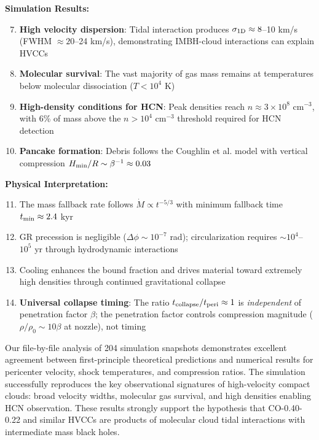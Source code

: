 \documentclass[twocolumn,amsmath,amssymb,prd,superscriptaddress,nofootinbib]{revtex4-2}
\begin{document}
\textbf{Simulation Results:}
\begin{enumerate}
    \setcounter{enumi}{6}
    \item \textbf{High velocity dispersion}: Tidal interaction produces $\sigma_{\rm 1D} \approx 8$--10 km/s (FWHM $\approx 20$--24 km/s), demonstrating IMBH-cloud interactions can explain HVCCs

    \item \textbf{Molecular survival}: The vast majority of gas mass remains at temperatures below molecular dissociation ($T < 10^4$ K)

    \item \textbf{High-density conditions for HCN}: Peak densities reach $n \approx 3 \times 10^8$ cm$^{-3}$, with 6\% of mass above the $n > 10^4$ cm$^{-3}$ threshold required for HCN detection

    \item \textbf{Pancake formation}: Debris follows the Coughlin et al. model with vertical compression $H_{\rm min}/R \sim \beta^{-1} \approx 0.03$
\end{enumerate}

\textbf{Physical Interpretation:}
\begin{enumerate}
    \setcounter{enumi}{10}
    \item The mass fallback rate follows $\dot{M} \propto t^{-5/3}$ with minimum fallback time $t_{\rm min} \approx 2.4$ kyr

    \item GR precession is negligible ($\Delta\phi \sim 10^{-7}$ rad); circularization requires $\sim 10^4$--$10^5$ yr through hydrodynamic interactions

    \item Cooling enhances the bound fraction and drives material toward extremely high densities through continued gravitational collapse

    \item \textbf{Universal collapse timing}: The ratio $t_{\rm collapse}/t_{\rm peri} \approx 1$ is \textit{independent} of penetration factor $\beta$; the penetration factor controls compression magnitude ($\rho/\rho_0 \sim 10\beta$ at nozzle), not timing
\end{enumerate}

Our file-by-file analysis of 204 simulation snapshots demonstrates excellent agreement between first-principle theoretical predictions and numerical results for pericenter velocity, shock temperatures, and compression ratios. The simulation successfully reproduces the key observational signatures of high-velocity compact clouds: broad velocity widths, molecular gas survival, and high densities enabling HCN observation. These results strongly support the hypothesis that CO-0.40-0.22 and similar HVCCs are products of molecular cloud tidal interactions with intermediate mass black holes.
\end{document}
